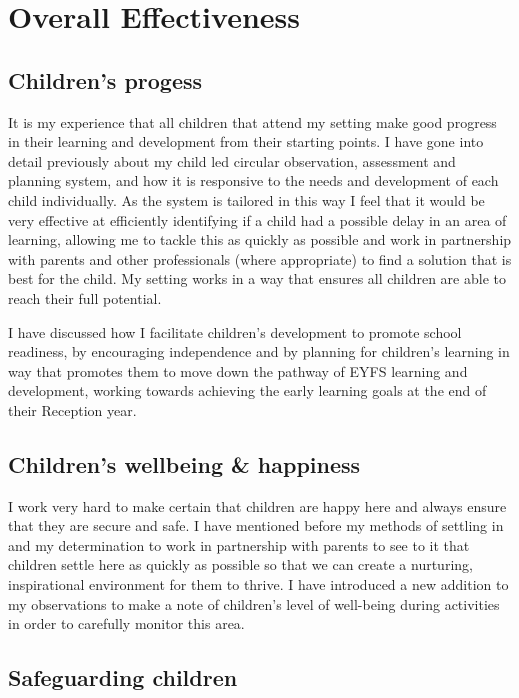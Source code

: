 \documentclass[10pt,a4paper]{report}
\begin{document}
\chapter{Overall Effectiveness}

\section{Children's progess}

It is my experience that all children that attend my setting make good progress in their learning and development from their starting points. I have gone into detail previously about my child led circular observation, assessment and planning system, and how it is responsive to the needs and development of each child individually. As the system is tailored in this way I feel that it would be very effective at efficiently identifying if a child had a possible delay in an area of learning, allowing me to tackle this as quickly as possible and work in partnership with parents and other professionals (where appropriate) to find a solution that is best for the child. My setting works in a way that ensures all children are able to reach their full potential. 

I have discussed how I facilitate children's development to promote school readiness, by encouraging independence and by planning for children's learning in way that promotes them to move down the pathway of EYFS learning and development, working towards achieving the early learning goals at the end of their Reception year. 

\section{Children's wellbeing \& happiness}

I work very hard to make certain that children are happy here and always ensure that they are secure and safe. I have mentioned before my methods of settling in and my determination to work in partnership with parents to see to it that children settle here as quickly as possible so that we can create a nurturing, inspirational environment for them to thrive. I have introduced a new addition to my observations to make a note of children's level of well-being during activities in order to carefully monitor this area.

\section{Safeguarding children}
\end{document}
